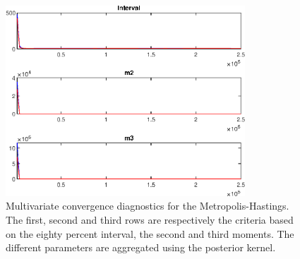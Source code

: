  
\begin{figure}[H]
\centering 
\includegraphics[width=0.8\textwidth]{BRS_growth_ext_comovement/Output/BRS_growth_ext_comovement_mdiag}
\caption{Multivariate convergence diagnostics for the Metropolis-Hastings.
The first, second and third rows are respectively the criteria based on
the eighty percent interval, the second and third moments. The different 
parameters are aggregated using the posterior kernel.}\label{Fig:MultivariateDiagnostics}
\end{figure}

